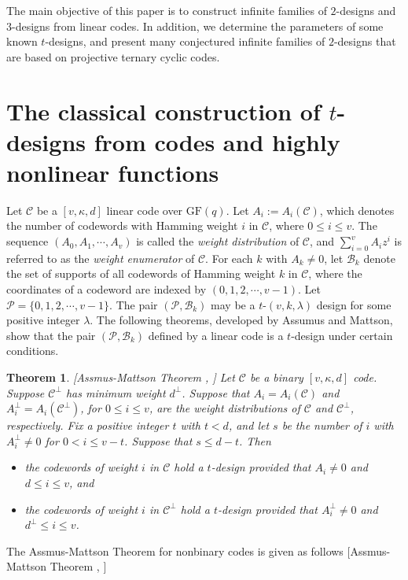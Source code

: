 \documentclass[1p,final]{elsarticle}
\newtheorem{theorem}{Theorem}
\newcommand{\gf}{{\mathrm{GF}}}
\newcommand{\cP}{{\mathcal{P}}}
\newcommand{\cB}{{\mathcal{B}}}
\newcommand{\C}{{\mathcal{C}}}
\begin{document}
The main objective of this paper is to construct infinite families of $2$-designs and 
$3$-designs from linear codes. In addition, we determine the parameters of some known 
$t$-designs, and present many conjectured infinite families of $2$-designs that are based 
on projective ternary cyclic codes. 

\section{The classical construction of $t$-designs from codes and highly nonlinear functions}

Let $\C$ be a $[v, \kappa, d]$ linear code over $\gf(q)$. Let $A_i:=A_i(\C)$, which denotes the
number of codewords with Hamming weight $i$ in $\C$, where $0 \leq i \leq v$. The sequence 
$(A_0, A_1, \cdots, A_{v})$ is
called the \textit{weight distribution} of $\C$, and $\sum_{i=0}^v A_iz^i$ is referred to as
the \textit{weight enumerator} of $\C$. For each $k$ with $A_k \neq 0$, let $\cB_k$ denote
the set of supports of all codewords of Hamming weight $k$ in $\C$, where the coordinates of a codeword
are indexed by $(0,1,2, \cdots, v-1)$. Let $\cP=\{0, 1, 2, \cdots, v-1\}$.  The pair $(\cP, \cB_k)$
may be a $t$-$(v, k, \lambda)$ design for some positive integer $\lambda$. The following
theorems, developed by Assumus and Mattson, show that the pair $(\cP, \cB_k)$ defined by 
a linear code is a $t$-design under certain conditions.

\begin{theorem}\label{thm-AM1}[Assmus-Mattson Theorem \cite{AM74}, \cite[p. 303]{HP03}] 
Let $\C$ be a binary $[v, \kappa, d]$ code. Suppose $\C^\perp$ has minimum weight $d^\perp$.
Suppose that $A_i=A_i(\C)$ and $A_i^\perp=A_i(\C^\perp)$, for $0 \leq i \leq v$, are the
weight distributions of $\C$ and $\C^\perp$, respectively. Fix a positive integer $t$
with $t < d$, and let $s$ be the number of $i$ with $A_i^\perp \ne 0$ for $0 < i \leq v-t$.
Suppose that $s \leq d -t$. Then
\begin{itemize}
\item the codewords of weight $i$ in $\C$ hold a $t$-design provided that $A_i \ne 0$ and
      $d \leq i \leq v$, and
\item the codewords of weight $i$ in $\C^\perp$ hold a $t$-design provided that
      $A_i^\perp \ne 0$ and $d^\perp \leq i \leq v$.
\end{itemize}
\end{theorem}

The Assmus-Mattson Theorem for nonbinary codes is given as follows [Assmus-Mattson Theorem \cite{AM74}, \cite[p. 303]{HP03}]
\end{document}
